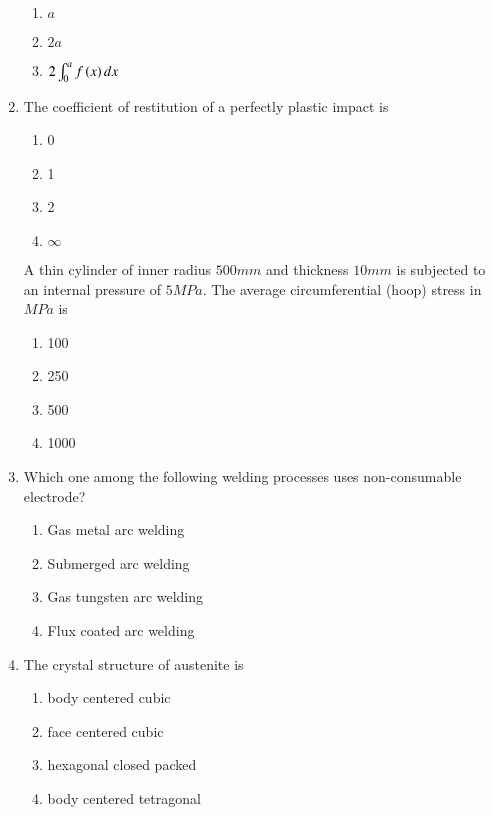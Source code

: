\documentclass[journal]{IEEEtran}
\begin{document}
\begin{enumerate}
\begin{enumerate}
			\item $a$
			\item $2a$
			\item $2 \int_{0}^{a} f\left(x\right) dx$
		\end{enumerate}
	\item
	The coefficient of restitution of a perfectly plastic impact is
		\begin{enumerate}
			\item 0
			\item 1
			\item 2
			\item $\infty$
		\end{enumerate}
	A thin cylinder of inner radius $500 mm$ and thickness $10 mm$ is subjected to an internal pressure of $5 MPa$. The average circumferential (hoop) stress in $MPa$ is
		\begin{enumerate}
			\item 100
			\item 250
			\item 500
			\item 1000
		\end{enumerate}
	\item
	Which one among the following welding processes uses non-consumable electrode?
		\begin{enumerate}
			\item Gas metal arc welding
			\item Submerged arc welding
			\item Gas tungsten arc welding
			\item Flux coated arc welding
		\end{enumerate}
	\item
	The crystal structure of austenite is
		\begin{enumerate}
			\item body centered cubic
			\item face centered cubic
			\item hexagonal closed packed
			\item body centered tetragonal
		\end{enumerate}
\end{enumerate}
\end{document}
